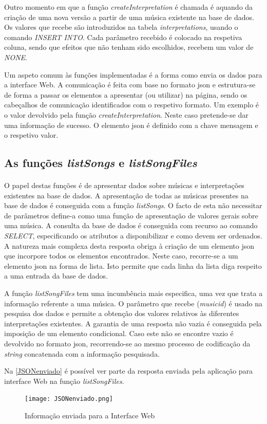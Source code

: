 \documentclass[11pt,openany,twoside]{report}
\begin{document}
Outro momento em que a função  \textit{createInterpretation} é chamada é aquando da criação de uma nova versão a partir de uma música existente na base de dados. Os valores que recebe são introduzidos na  tabela \textit{interpretations}, usando o comando \textit{INSERT INTO}. Cada parâmetro recebido é colocado na respetiva coluna, sendo que efeitos que não tenham sido escolhidos, recebem um valor de \textit{NONE}.

Um aspeto comum às funções implementadas é a forma como envia os dados para a interface Web. A comunicação é feita com base no formato \acs{json} e estrutura-se de forma a passar os elementos a apresentar (ou utilizar) na página, sendo os cabeçalhos de comunicação identificados com o respetivo formato. Um exemplo é o valor devolvido pela função \textit{createInterpretation}. Neste caso pretende-se dar uma informação de sucesso. O elemento \acs{json} é definido com a chave mensagem e  o respetivo valor.



\subsection{As funções \textit{listSongs} e \textit{listSongFiles}}
\paragraph{ }O papel destas funções é de apresentar dados sobre músicas e interpretações existentes na base de dados. A apresentação de todas as músicas presentes na base de dados é conseguida com a função \textit{listSongs}. O facto de esta não necessitar de parâmetros define-a como uma função de apresentação de valores gerais sobre uma música. A consulta da base de dados é conseguida com recurso ao comando \textit{SELECT}, especificando os atributos a disponibilizar e como devem ser ordenados. A natureza mais complexa desta resposta obriga à criação de um elemento \acs{json} que incorpore todos os elementos encontrados. Neste caso, recorre-se a um elemento \acs{json} na forma de lista. Isto permite que cada linha da lista diga respeito a uma entrada da base de dados.

A função \textit{listSongFiles} tem uma incumbência mais especifica, uma vez que trata a informação referente a uma música. O parâmetro que recebe (\textit{musicid}) é usado na pesquisa dos dados e permite a obtenção dos valores relativos às diferentes interpretações existentes. A garantia de uma resposta não vazia é conseguida pela imposição de um elemento condicional. Caso este não se encontre vazio é devolvido no formato \acs{json}, recorrendo-se ao mesmo processo de codificação da \textit{string} concatenada com a informação pesquisada. 

Na \autoref{JSONenviado} é possível ver parte da resposta enviada pela aplicação para interface Web na função \textit{listSongFiles}.
\begin{figure}[h!]
 \center
 \texttt{[image: JSONenviado.png]}
 \caption{Informação enviada para a Interface Web}
 \label{JSONenviado}
\end{figure}
\end{document}
